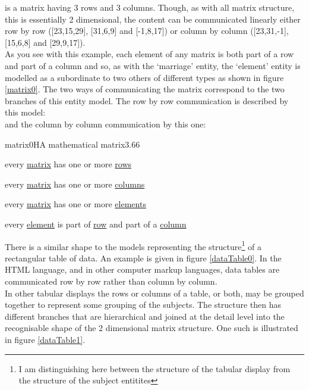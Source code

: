 \noindent is a matrix having 3 rows and 3 columns. Though, as with all matrix structure, this is essentially 2 dimensional, the content can be communicated linearly either row by row ([23,15,29], [31,6,9] and [-1,8,17])  or column by column ([23,31,-1],[15,6,8] and [29,9,17]). \\

\noindent As you see with this example, each element of any matrix is both part of a row and part of a column and so, as with the `marriage' entity, the `element' entity is 
modelled as a subordinate to two others of different types as shown in figure \ref{matrix0}. The two ways of communicating the matrix correspond to the two branches of this entity model. The row by row communication is described by this model: \\
and the column by column communication by this one:

\begin{erbulletedDimFig}{matrix0}{H}{A mathematical matrix}{3.6}{6}
\item{every \underline{matrix} has one or more \underline{rows}}
\item{every \underline{matrix} has one or more \underline{columns}}
\item{every \underline{matrix} has one or more \underline{elements}}
\item{every \underline{element} is part of \underline{row} and part of a \underline{column}}
\end{erbulletedDimFig}

\noindent There is a similar shape to the models representing the structure\footnote{I am distinguishing here between the structure of the tabular display from the structure of the subject entitites} of a rectangular table of data. An example is given in figure \ref{dataTable0}. In the HTML language, and in other computer markup languages, data tables are communicated row by row rather than column by column.\\

\noindent In other tabular displays the rows or columns of a table, or both, may be grouped together
to represent some grouping of the subjects. The structure then has different branches that are hierarchical and joined at the detail level
into the recognisable shape of the 2 dimensional matrix structure. One such is illustrated in figure \ref{dataTable1}. \\


